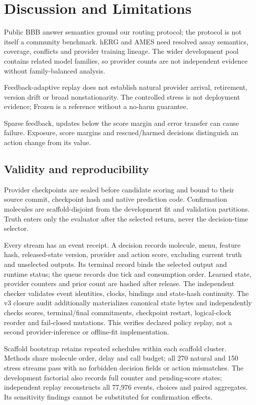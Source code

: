 \documentclass[sigconf,anonymous]{aamas}
\begin{document}
\section{Discussion and Limitations}
Public BBB answer semantics ground our routing protocol; the protocol is not itself a community benchmark. hERG and AMES need resolved assay semantics, coverage, conflicts and provider training lineage. The wider development pool contains related model families, so provider counts are not independent evidence without family-balanced analysis.

Feedback-adaptive replay does not establish natural provider arrival, retirement, version drift or broad nonstationarity. The controlled stress is not deployment evidence; Frozen is a reference without a no-harm guarantee.

Sparse feedback, updates below the score margin and error transfer can cause failure. Exposure, score margins and rescued/harmed decisions distinguish an action change from its value.

\subsection{Validity and reproducibility}
Provider checkpoints are sealed before candidate scoring and bound to their source commit, checkpoint hash and native prediction code. Confirmation molecules are scaffold-disjoint from the development fit and validation partitions. Truth enters only the evaluator after the selected return, never the decision-time selector.

Every stream has an event receipt. A decision records molecule, menu, feature hash, released-state version, provider and action score, excluding current truth and unselected outputs. Its terminal record binds the selected output and runtime status; the queue records due tick and consumption order. Learned state, provider counters and prior count are hashed after release. The independent checker validates event identities, clocks, bindings and state-hash continuity. The v3 closure audit additionally materializes canonical state bytes and independently checks scores, terminal/final commitments, checkpoint restart, logical-clock reorder and fail-closed mutations. This verifies declared policy replay, not a second provider-inference or offline-fit implementation.

Scaffold bootstrap retains repeated schedules within each scaffold cluster. Methods share molecule order, delay and call budget; all 270 natural and 150 stress streams pass with no forbidden decision fields or action mismatches. The development factorial also records full counter and pending-score states; independent replay reconstructs all 77,976 events, choices and paired aggregates. Its sensitivity findings cannot be substituted for confirmation effects.
\end{document}
